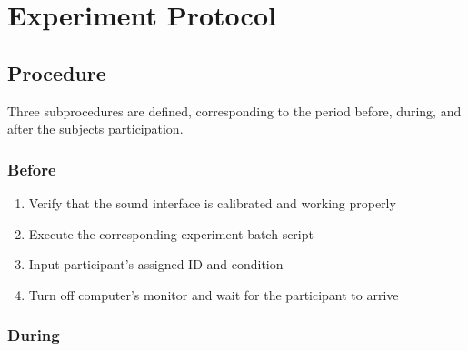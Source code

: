 \documentclass[../main.tex]{subfiles}
\begin{document}
\chapter{Experiment Protocol}
\label{chap:experiment_protocol}

\section{Procedure}

Three subprocedures are defined, corresponding to the period before, during, and
after the subjects participation.

\subsection{Before}

\begin{enumerate}
  \item Verify that the sound interface is calibrated and working properly
  \item Execute the corresponding experiment batch script\footnotemark[1]
  \item Input participant's assigned ID and condition\footnotemark[2]
  \item Turn off computer's monitor and wait for the participant to arrive
\end{enumerate}


\subsection{During}
\end{document}
